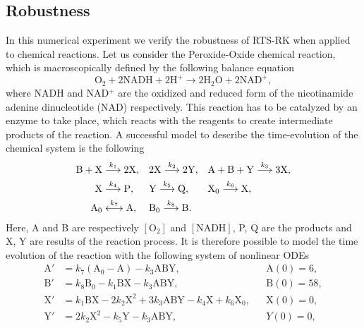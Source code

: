 \documentclass[10pt]{article}
\begin{document}
\subsection{Robustness} In this numerical experiment we verify the robustness of RTS-RK when applied to chemical reactions. Let us consider the Peroxide-Oxide chemical reaction, which is macroscopically defined by the following balance equation
\begin{equation}
	\mathrm{O}_2 + 2\mathrm{NADH} + 2\mathrm{H}^+ \to 2\mathrm{H}_2\mathrm{O} + 2\mathrm{NAD}^+,
\end{equation}
where NADH and NAD$^+$ are the oxidized and reduced form of the nicotinamide adenine dinucleotide (NAD) respectively. This reaction has to be catalyzed by an enzyme to take place, which reacts with the reagents to create intermediate products of the reaction. A successful model \cite{Ols83} to describe the time-evolution of the chemical system is the following
\begin{equation}
\begin{aligned}
	\mathrm{B} + \mathrm{X} &\stackrel{k_1}{\longrightarrow} 2 \mathrm{X}, 
	&&2\mathrm{X} \stackrel{k_2}{\longrightarrow} 2\mathrm{Y}, 
	&&\mathrm{A} + \mathrm{B} + \mathrm{Y} \stackrel{k_3}{\longrightarrow} 3 \mathrm{X}, \\
	\mathrm{X} &\stackrel{k_4}{\longrightarrow} \mathrm{P}, 
	&&\mathrm{Y} \stackrel{k_5}{\longrightarrow} \mathrm{Q}, 
	&&\mathrm{X_0} \stackrel{k_6}{\longrightarrow} \mathrm{X}, \\
	\mathrm{A_0} &\stackrel{k_7}{\longleftrightarrow} \mathrm{A}, 
	&&\mathrm{B_0} \stackrel{k_8}{\longrightarrow} \mathrm{B}.
\end{aligned}
\end{equation}
Here, A and B are respectively $[\mathrm{O}_2]$ and $[\mathrm{NADH}]$, P, Q are the products and X, Y are  results of the reaction process. It is therefore possible to model the time evolution of the reaction with the following system of nonlinear ODEs 
\begin{equation}\label{eq:PeroxOx}
\begin{aligned}
	\mathrm{A}' &= k_7  (\mathrm{A}_0 - \mathrm{A}) - k_3  \mathrm{A}\mathrm{B}\mathrm{Y}, &&\mathrm{A}(0) = 6, \\
	\mathrm{B}' &= k_8\mathrm{B}_0 - k_1  \mathrm{B}\mathrm{X} - k_3  \mathrm{A}\mathrm{B}\mathrm{Y}, &&\mathrm{B}(0) = 58, \\
	\mathrm{X}' &= k_1  \mathrm{B}\mathrm{X} - 2  k_2  \mathrm{X}^2 + 3  k_3 \mathrm{A}\mathrm{B}\mathrm{Y} - k_4  \mathrm{X} + k_6\mathrm{X}_0,&& \mathrm{X}(0) = 0, \\
	\mathrm{Y}' &= 2  k_2  \mathrm{X}^2 - k_5  \mathrm{Y} - k_3  \mathrm{A}\mathrm{B}\mathrm{Y}, && Y(0) = 0,
\end{aligned}
\end{equation}
\end{document}
